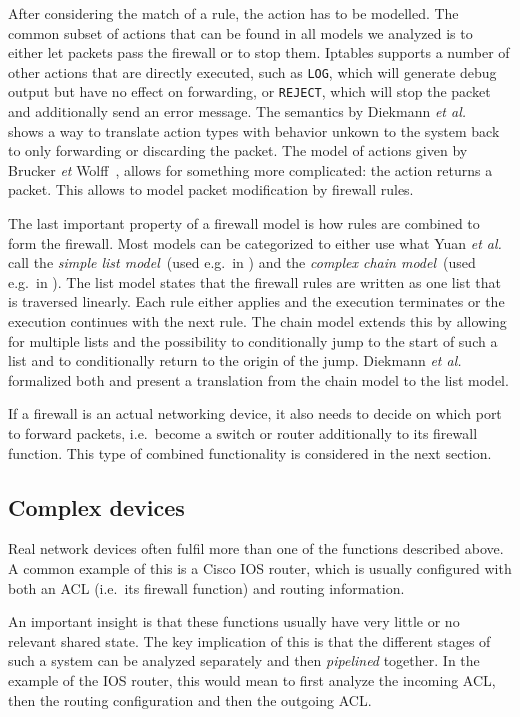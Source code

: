 After considering the match of a rule, the action has to be modelled.
The common subset of actions that can be found in all models we analyzed is to either let packets pass the firewall or to stop them.
Iptables supports a number of other actions that are directly executed, such as \texttt{LOG}, which will generate debug output but have no effect on forwarding, or \texttt{REJECT}, which will stop the packet and additionally send an error message.
The semantics by Diekmann \emph{et al.}~\cite{diekmann2015semantics} shows a way to translate action types with behavior unkown to the system back to only forwarding or discarding the packet.
The model of actions given by Brucker \emph{et} Wolff~\cite{brucker2007test}, allows for something more complicated:  the action returns a packet.
This allows to model packet modification by firewall rules.

The last important property of a firewall model is how rules are combined to form the firewall.
Most models can be categorized to either use what Yuan \emph{et al.}~\cite{yuan2006fireman} call the \emph{simple list model}~(used e.g.\ in \cite{nelson2010margrave}) and the \emph{complex chain model}~(used e.g.\ in \cite{marmorstein2005tool}).
The list model states that the firewall rules are written as one list that is traversed linearly.
Each rule either applies and the execution terminates or the execution continues with the next rule.
The chain model extends this by allowing for multiple lists and the possibility to conditionally jump to the start of such a list and to conditionally return to the origin of the jump.
Diekmann \emph{et al.}~\cite{diekmann2015semantics} formalized both and present a translation from the chain model to the list model. 

If a firewall is an actual networking device, it also needs to decide on which port to forward packets, i.e.\ become a switch or router additionally to its firewall function.
This type of combined functionality is considered in the next section.
\subsection{Complex devices}\label{sec:pl}
Real network devices often fulfil more than one of the functions described above.
A common example of this is a Cisco IOS router, which is usually configured with both an ACL (i.e.\ its firewall function) and routing information.

An important insight is that these functions usually have very little or no relevant shared state.
The key implication of this is that the different stages of such a system can be analyzed separately and then \emph{pipelined} together.
In the example of the IOS router, this would mean to first analyze the incoming ACL, then the routing configuration and then the outgoing ACL.

